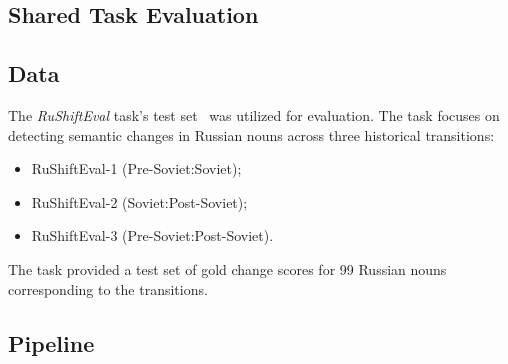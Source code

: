 \documentclass[a0,portrait]{a0poster}
\begin{document}
\begin{multicols}{2}

\section*{Shared Task Evaluation}

\subsection*{Data}

The \textit{RuShiftEval} task's test set~\cite{rushifteval} was utilized for evaluation.
The task focuses on detecting semantic changes in Russian nouns across three historical transitions:
\begin{itemize}
    \item RuShiftEval-1 (Pre-Soviet:Soviet);
    \item RuShiftEval-2 (Soviet:Post-Soviet);
    \item RuShiftEval-3 (Pre-Soviet:Post-Soviet).
\end{itemize}
The task provided a test set of gold change scores for 99 Russian nouns corresponding to the transitions.

\subsection*{Pipeline}

\usetikzlibrary{positioning, shadows, arrows.meta}

\end{multicols}
\end{document}
